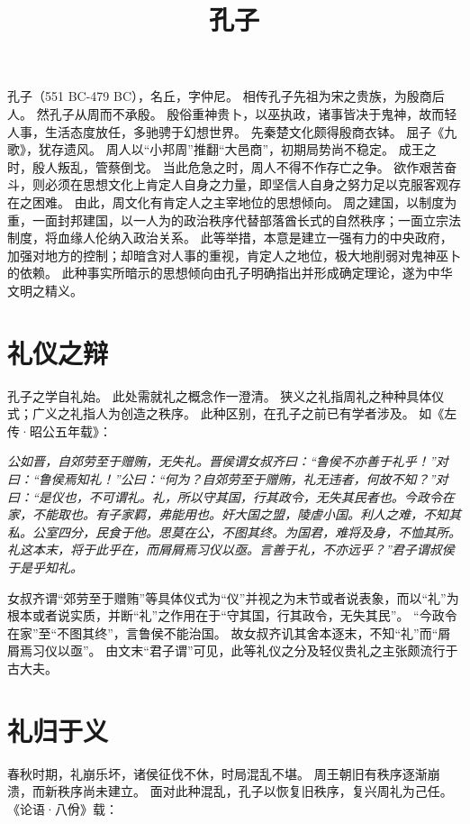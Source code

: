 \documentclass[11pt]{article}
\title{孔子}
\date{}
\begin{document}
  \maketitle
  
  \linenumbers
孔子（551 BC-479 BC），名丘，字仲尼。
相传孔子先祖为宋之贵族，为殷商后人。
然孔子从周而不承殷。
殷俗重神贵卜，以巫执政，诸事皆决于鬼神，故而轻人事，生活态度放任，多驰骋于幻想世界。
先秦楚文化颇得殷商衣钵。
屈子《九歌》，犹存遗风。
周人以“小邦周”推翻“大邑商”，初期局势尚不稳定。
成王之时，殷人叛乱，管蔡倒戈。
当此危急之时，周人不得不作存亡之争。
欲作艰苦奋斗，则必须在思想文化上肯定人自身之力量，即坚信人自身之努力足以克服客观存在之困难。
由此，周文化有肯定人之主宰地位的思想倾向。
周之建国，以制度为重，一面封邦建国，以一人为的政治秩序代替部落酋长式的自然秩序；一面立宗法制度，将血缘人伦纳入政治关系。
此等举措，本意是建立一强有力的中央政府，加强对地方的控制；却暗含对人事的重视，肯定人之地位，极大地削弱对鬼神巫卜的依赖。
此种事实所暗示的思想倾向由孔子明确指出并形成确定理论，遂为中华文明之精义。

\section{礼仪之辩}
孔子之学自礼始。
此处需就礼之概念作一澄清。
狭义之礼指周礼之种种具体仪式；广义之礼指人为创造之秩序。
此种区别，在孔子之前已有学者涉及。
如《左传·昭公五年载》：

\textit{公如晋，自郊劳至于赠贿，无失礼。晋侯谓女叔齐曰：“鲁侯不亦善于礼乎！”对曰：“鲁侯焉知礼！”公曰：“何为？自郊劳至于赠贿，礼无违者，何故不知？”对曰：“是仪也，不可谓礼。礼，所以守其国，行其政令，无失其民者也。今政令在家，不能取也。有子家羁，弗能用也。奸大国之盟，陵虐小国。利人之难，不知其私。公室四分，民食于他。思莫在公，不图其终。为国君，难将及身，不恤其所。礼这本末，将于此乎在，而屑屑焉习仪以亟。言善于礼，不亦远乎？”君子谓叔侯于是乎知礼。}

女叔齐谓“郊劳至于赠贿”等具体仪式为“仪”并视之为末节或者说表象，而以“礼”为根本或者说实质，并断“礼”之作用在于“守其国，行其政令，无失其民”。
“今政令在家”至“不图其终”，言鲁侯不能治国。
故女叔齐讥其舍本逐末，不知“礼”而“屑屑焉习仪以亟”。
由文末“君子谓”可见，此等礼仪之分及轻仪贵礼之主张颇流行于古大夫。

\section{礼归于义}
春秋时期，礼崩乐坏，诸侯征伐不休，时局混乱不堪。
周王朝旧有秩序逐渐崩溃，而新秩序尚未建立。
面对此种混乱，孔子以恢复旧秩序，复兴周礼为己任。
《论语·八佾》载：
\end{document}
